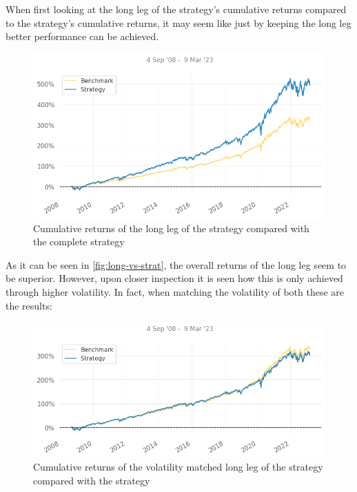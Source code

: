 When first looking at the long leg of the strategy's cumulative returns compared to the strategy's cumulative returns, it may seem like just by keeping the long leg better performance can be achieved.

\begin{figure}[ht]
    \captionsetup{justification=centering}
    \includegraphics[width=\linewidth]{assets/long-vs-strat.png}
    \caption{Cumulative returns of the long leg of the strategy compared with the complete strategy}
    \label{fig:long-vs-strat}
\end{figure}

As it can be seen in \autoref{fig:long-vs-strat}, the overall returns of the long leg seem to be superior. However, upon closer inspection it is seen how this is only achieved through higher volatility. In fact, when matching the volatility of both these are the results:
\newpage
\begin{figure}[ht]
    \captionsetup{justification=centering}
    \includegraphics[width=\linewidth]{assets/long-vs-strat-vol-matched.png}
    \caption{Cumulative returns of the volatility matched long leg of the strategy compared with the strategy}
    \label{fig:long-vs-strat-vol-matched}
\end{figure}

